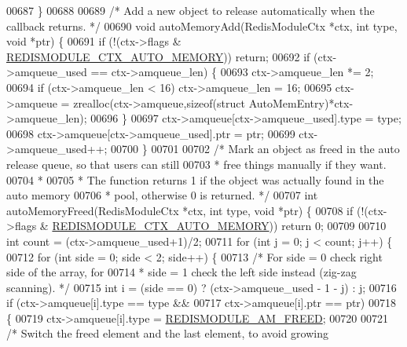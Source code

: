 \begin{DoxyCode}
{00687 \}
00688 
00689 \textcolor{comment}{/* Add a new object to release automatically when the callback returns. */}
00690 \textcolor{keywordtype}{void} autoMemoryAdd(RedisModuleCtx *ctx, \textcolor{keywordtype}{int} type, \textcolor{keywordtype}{void} *ptr) \{
00691     \textcolor{keywordflow}{if} (!(ctx->flags & \hyperlink{module_8c_a223998b47b49203e12aba298a7a8fd14}{REDISMODULE\_CTX\_AUTO\_MEMORY})) \textcolor{keywordflow}{return};
00692     \textcolor{keywordflow}{if} (ctx->amqueue\_used == ctx->amqueue\_len) \{
00693         ctx->amqueue\_len *= 2;
00694         \textcolor{keywordflow}{if} (ctx->amqueue\_len < 16) ctx->amqueue\_len = 16;
00695         ctx->amqueue = zrealloc(ctx->amqueue,\textcolor{keyword}{sizeof}(\textcolor{keyword}{struct} AutoMemEntry)*ctx->amqueue\_len);
00696     \}
00697     ctx->amqueue[ctx->amqueue\_used].type = type;
00698     ctx->amqueue[ctx->amqueue\_used].ptr = ptr;
00699     ctx->amqueue\_used++;
00700 \}
00701 
00702 \textcolor{comment}{/* Mark an object as freed in the auto release queue, so that users can still}
00703 \textcolor{comment}{ * free things manually if they want.}
00704 \textcolor{comment}{ *}
00705 \textcolor{comment}{ * The function returns 1 if the object was actually found in the auto memory}
00706 \textcolor{comment}{ * pool, otherwise 0 is returned. */}
00707 \textcolor{keywordtype}{int} autoMemoryFreed(RedisModuleCtx *ctx, \textcolor{keywordtype}{int} type, \textcolor{keywordtype}{void} *ptr) \{
00708     \textcolor{keywordflow}{if} (!(ctx->flags & \hyperlink{module_8c_a223998b47b49203e12aba298a7a8fd14}{REDISMODULE\_CTX\_AUTO\_MEMORY})) \textcolor{keywordflow}{return} 0;
00709 
00710     \textcolor{keywordtype}{int} count = (ctx->amqueue\_used+1)/2;
00711     \textcolor{keywordflow}{for} (\textcolor{keywordtype}{int} j = 0; j < count; j++) \{
00712         \textcolor{keywordflow}{for} (\textcolor{keywordtype}{int} side = 0; side < 2; side++) \{
00713             \textcolor{comment}{/* For side = 0 check right side of the array, for}
00714 \textcolor{comment}{             * side = 1 check the left side instead (zig-zag scanning). */}
00715             \textcolor{keywordtype}{int} i = (side == 0) ? (ctx->amqueue\_used - 1 - j) : j;
00716             \textcolor{keywordflow}{if} (ctx->amqueue[i].type == type &&
00717                 ctx->amqueue[i].ptr == ptr)
00718             \{
00719                 ctx->amqueue[i].type = \hyperlink{module_8c_ab136b31f4a0598600f6678d7fd027ee4}{REDISMODULE\_AM\_FREED};
00720 
00721                 \textcolor{comment}{/* Switch the freed element and the last element, to avoid growing}
}
\end{DoxyCode}
